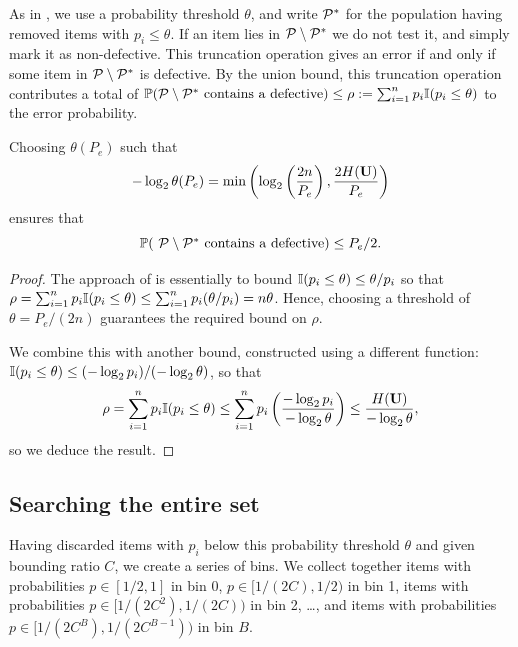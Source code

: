 As in \cite{li5}, we use a probability threshold $\theta$, and write ${\mathcal{P}}^*$ for the population having removed items with $p_i \leq \theta$.
If an item lies in ${\mathcal{P}} \setminus {\mathcal{P}}^*$ we do not 
test it, and simply mark it as non-defective. This truncation operation gives an error if and only if some item in ${\mathcal{P}} \setminus {\mathcal{P}}^*$ is defective.
By the union bound, 
this truncation operation contributes a total of ${\mathbb{P}}( \mbox{${\mathcal{P}} \setminus {\mathcal{P}}^*$ contains a defective}) \leq  \rho := \sum_{i=1}^n p_i {\mathbb{I}}(p_i \leq \theta)$ to the error probability.



\begin{lemma} \label{lem:thresh}
Choosing $\theta(P_e)$ such that  
\begin{equation} \label{eq:thetadef}
-\log_2 \theta(P_e) = \min\left( \log_2  \left( \frac{2n}{P_e} \right), \frac{2 H( {\mathbf{ U}})}{P_e} \right)
\end{equation}
ensures that  
\begin{equation}
{\mathbb{P}}( \mbox{ ${\mathcal{P}} \setminus {\mathcal{P}}^*$ contains a defective} ) \leq P_e/2. \label{eq:setpstar} \end{equation} \end{lemma}
\begin{proof}
The approach of \cite{li5} is essentially to bound ${\mathbb{I}}(p_i \leq \theta) \leq \theta/p_i$ so that
$\rho = \sum_{i=1}^n p_i {\mathbb{I}}(p_i \leq \theta) \leq \sum_{i=1}^n p_i (\theta/p_i) = n \theta$. Hence, choosing a threshold
of $\theta = P_e/(2n)$ guarantees the required bound on $\rho$.

We combine this with another bound, constructed using a different function:
 ${\mathbb{I}}(p_i \leq \theta) \leq (-\log_2 p_i)/(-\log_2 \theta)$, so that
$$ \rho = \sum_{i=1}^n p_i {\mathbb{I}}(p_i \leq \theta) \leq \sum_{i=1}^n p_i  \left( 
\frac{-\log_2 p_i}{-\log_2 \theta } \right) \leq \frac{H( {\mathbf{ U}})}{-\log_2 \theta},$$ 
so we deduce the result. \end{proof}

\subsection{Searching the entire set} 

Having discarded items with $p_i$ below
this probability threshold $\theta$ and given bounding ratio $C$,
we create a series of bins. We collect together items with probabilities $p \in [1/2,1]$ in bin 0,
$p \in [1/(2C), 1/2)$ in bin 1, items with probabilities $p \in [1/(2C^2), 1/(2C))$ in bin 2, \ldots, and items with probabilities $p \in 
[1/(2C^B), 1/(2C^{B-1}))$ in bin $B$.

